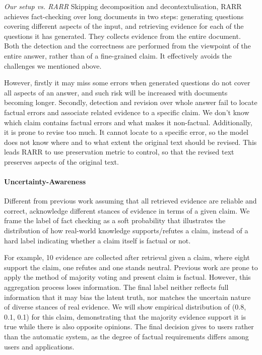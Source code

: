 \documentclass[11pt]{article}
\begin{document}
\textit{Our setup vs. RARR}
Skipping decomposition and decontextulisation, RARR achieves fact-checking over long documents in two steps: generating questions covering different aspects of the input, and retrieving evidence for each of the questions it has generated.
They collects evidence from the entire document.
Both the detection and the correctness are performed from the viewpoint of the entire answer, rather than of a fine-grained claim.
It effectively avoids the challenges we mentioned above.

However, firstly it may miss some errors when generated questions do not cover all aspects of an answer, and such risk will be increased with documents becoming longer.
Secondly, detection and revision over whole answer fail to locate factual errors and associate related evidence to a specific claim. 
We don't know which claim contains factual errors and what makes it non-factual.
Additionally, it is prone to revise too much.
It cannot locate to a specific error, so the model does not know where and to what extent the original text should be revised.
This leads RARR to use preservation metric to control, so that the revised text preserves aspects of the original text.

\paragraph{Uncertainty-Awareness}
Different from previous work assuming that all retrieved evidence are reliable and correct, acknowledge different stances of evidence in terms of a given claim.
We frame the label of fact checking as a soft probability that illustrates the distribution of how real-world knowledge supports/refutes a claim, instead of a hard label indicating whether a claim itself is factual or not.

For example, 10 evidence are collected after retrieval given a claim, where eight support the claim, one refutes and one stands neutral.
Previous work are prone to apply the method of majority voting and present claim is factual.
However, this aggregation process loses information.
The final label neither reflects full information that it may bias the latent truth, nor matches the uncertain nature of diverse stances of real evidence.
We will show empirical distribution of (0.8, 0.1, 0.1) for this claim, demonstrating that the majority evidence support it is true while there is also opposite opinions. 
The final decision gives to users rather than the automatic system, as the degree of factual requirements differs among users and applications.
\end{document}
